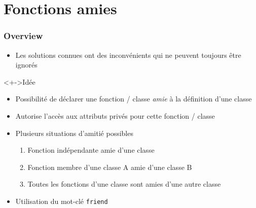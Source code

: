 \section{Fonctions amies}

\begin{frame}
\frametitle{Overview}
\begin{itemize}[<+->]
\item Les solutions connues ont des inconvénients qui ne peuvent toujours être ignorés
\end{itemize}
\begin{exampleblock}<+->{Idée}
	\begin{itemize}
	\item Possibilité de déclarer une fonction / classe \emph{amie} à la définition d'une classe
	\item Autorise l'accès aux attributs privés pour cette fonction / classe
	\end{itemize}
\end{exampleblock}
\begin{itemize}[<+->]
\item Plusieurs situations d'amitié possibles
	\begin{enumerate}
	\item Fonction indépendante amie d'une classe
	\item Fonction membre d'une classe A amie d'une classe B
	\item Toutes les fonctions d'une classe sont amies d'une autre classe
	\end{enumerate}
\item Utilisation du mot-clé \lstinline|friend|
\end{itemize}
\end{frame}

